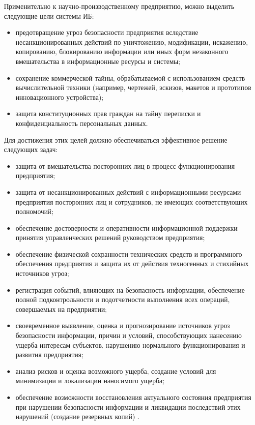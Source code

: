 Применительно к научно-производственному предприятию, можно выделить следующие цели системы ИБ:
\begin{itemize}
	\item предотвращение угроз безопасности предприятия вследствие несанкционированных действий по уничтожению, модификации, искажению, копированию, блокированию информации или иных форм незаконного вмешательства в информационные ресурсы и системы;
	\item сохранение коммерческой тайны, обрабатываемой с использованием средств вычислительной техники (например, чертежей, эскизов, макетов и прототипов инновационного устройства);
	\item защита конституционных прав граждан на тайну переписки и конфиденциальность персональных данных.
\end{itemize}

Для достижения этих целей должно обеспечиваться эффективное решение следующих задач:
\begin{itemize}
	\item защита от вмешательства посторонних лиц в процесс функционирования предприятия;
	\item защита от несанкционированных действий с информационными ресурсами предприятия посторонних лиц и сотрудников, не имеющих соответствующих полномочий;
	\item обеспечение достоверности и оперативности информационной поддержки принятия управленческих решений руководством предприятия;
	\item обеспечение физической сохранности технических средств и программного обеспечения предприятия и защита их от действия техногенных и стихийных источников угроз;
	\item регистрация событий, влияющих на безопасность информации, обеспечение полной подконтрольности и подотчетности выполнения всех операций, совершаемых на предприятии;
	\item своевременное выявление, оценка и прогнозирование источников угроз безопасности информации, причин и условий, способствующих нанесению ущерба интересам субъектов, нарушению нормального функционирования и развития предприятия;
	\item анализ рисков и оценка возможного ущерба, создание условий для минимизации и локализации наносимого ущерба;
	\item обеспечение возможности восстановления актуального состояния предприятия при нарушении безопасности информации и ликвидации последствий этих нарушений (создание резервных копий) \cite{info_security_goals}.
\end{itemize}
